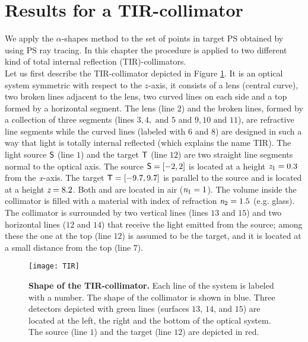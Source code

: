 \section{Results for a TIR-collimator}\label{sec:results-Tir-alpha}
We apply the $\alpha$-shapes method to the set of points in target PS obtained by using PS ray tracing.
In this chapter the procedure is applied to two different kind of total internal reflection (TIR)-collimators.\\ \indent  
Let us first describe the TIR-collimator depicted in Figure \ref{fig:tir}. It is an optical system symmetric with respect to the $z$-axis, it consists of a lens (central curve), two broken lines adjacent to the lens,
two curved lines on each side and a top formed by a horizontal segment. The lens (line $2$) and the broken lines, formed by a collection of three segments (lines $3, 4, \mbox{ and } 5$ and $9, 10 \mbox{ and } 11$), are refractive line segments while the curved lines (labeled with $6$ and $8$) are designed in such a way that light is totally internal reflected (which explains the name TIR).
The light source $\textsf{S}$ (line $1$) and the target $\textsf{T}$ (line $12$) are two straight line segments normal to the optical axis.
The source $\textsf{S}= [-2,2]$ is located at a height $\textit{z}_{1} = 0.3$ from the $\textit{x}$-axis.
 The target $\textsf{T}= [-9.7, 9.7]$ is parallel to the source and is located at a height $ \textit{z}= 8.2$. Both  and  are located in air ($\textit{n}_1=1$).
The volume inside the collimator is filled with a material with index of refraction $\textit{n}_2=1.5$ (e.g. glass).
The collimator is surrounded by two vertical lines (lines $13$ and $15$) and two horizontal lines ($12$ and $14$) that receive the light emitted from the source; among these the one at the top (line $12$) is assumed to be the target, and it is located at a small distance from the top (line $7$). 
\begin{figure}[h]
  \begin{center}
  \texttt{[image: TIR]}
  \end{center}
  \caption{\textbf{Shape of the TIR-collimator.} Each line of the system is labeled with a number.
   The shape of the collimator is shown in blue.
   Three detectors depicted with green lines (surfaces $13$, $14$, and $15$) are located at the left, the right and the bottom of the optical system. The source (line $1$) and the target (line $12$) are depicted in red.}
  \label{fig:tir}
\end{figure}
